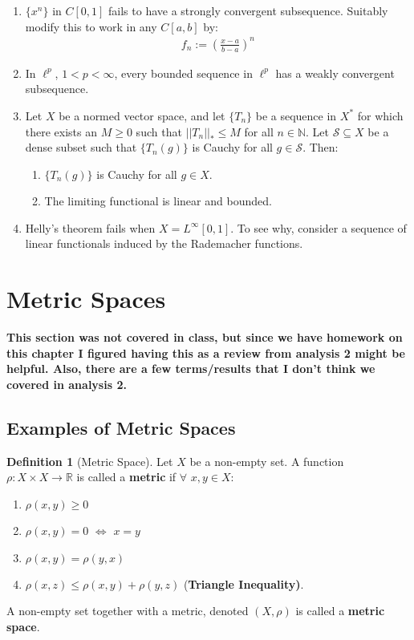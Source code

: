\documentclass[11pt]{article}
\theoremstyle{definition}
\theoremstyle{definition}
\newcommand{\R}[0]{\mathbb{R}}
\newcommand{\N}[0]{\mathbb{N}}
\theoremstyle{definition}
\newtheorem{definition}{\textcolor{OliveGreen}{Definition}}
\theoremstyle{remark}
\begin{document}
\begin{enumerate}
 	\item $\{ x^n \}$ in $C[0,1]$ fails to have a strongly convergent subsequence. Suitably modify this to work in any $C[a,b]$ by: 
 	\begin{align*}
 		f_n := \left( \frac{x-a}{b-a} \right)^n 
 	\end{align*}
 	\item In $\ell^p$, $1 < p < \infty$, every bounded sequence in $\ell^p$ has a weakly convergent subsequence. 
 	\item Let $X$ be a normed vector space, and let $\{ T_n \}$ be a sequence in $X^*$ for which there exists an $M \geq 0$ such that $||T_n ||_* \leq M$ for all $n \in \N$. Let $\mathcal{S} \subseteq X$ be a dense subset such that $\{ T_n (g) \}$ is Cauchy for all $g \in \mathcal{S}$. Then: 
 	\begin{enumerate}[noitemsep]
 		\item $\{ T_n (g) \}$ is Cauchy for all $g \in X$. 
 		\item The limiting functional is linear and bounded. 
 	\end{enumerate}
 	\item Helly's theorem fails when $X = L^\infty [0,1]$. To see why, consider  a sequence of linear functionals induced by the Rademacher functions. 
\end{enumerate}

\section{Metric Spaces}
\textbf{This section was not covered in class, but since we have homework on this chapter I figured having this as a review from analysis 2 might be helpful. Also, there are a few terms/results that I don't think we covered in analysis 2.}

\subsection{Examples of Metric Spaces}

\begin{definition}[Metric Space]
	Let $X$ be a non-empty set. A function $\rho: X \times X \rightarrow \R$ is called a \textbf{metric} if $\forall$ $x, y \in X$: 
	\begin{enumerate}[noitemsep]
		\item $\rho(x,y) \geq 0$ 
		\item $\rho(x,y) = 0$ $\iff$ $x=y$ 
		\item $\rho(x,y) = \rho(y,x)$
		\item $\rho(x,z) \leq \rho(x,y) + \rho(y,z)$ (\textbf{Triangle Inequality)}. 
	\end{enumerate}
	A non-empty set together with a metric, denoted $(X, \rho)$ is called a \textbf{metric space}. 
\end{definition}
\end{document}
